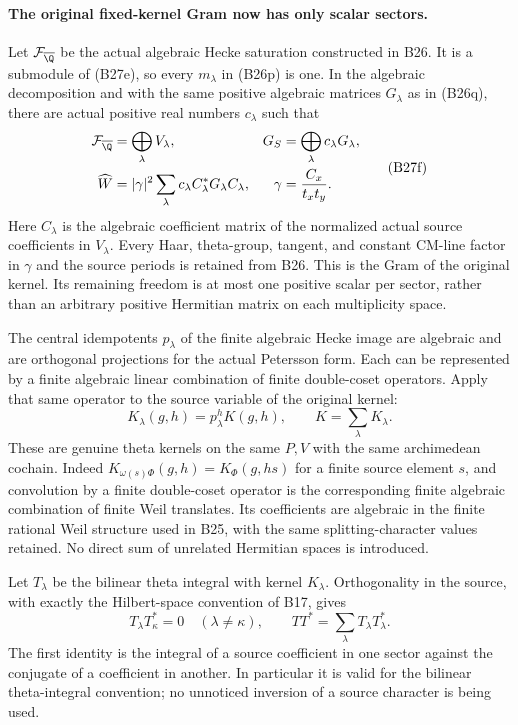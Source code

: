 \paragraph{The original fixed-kernel Gram now has only scalar sectors.}
Let $\mathcal F_{\overline\Q}$ be the actual algebraic Hecke
saturation constructed in B26.  It is a submodule of (B27e),
so every $m_\lambda$ in (B26p) is one.  In the algebraic
decomposition and with the same positive algebraic matrices
$G_\lambda$ as in (B26q), there are actual positive real
numbers $c_\lambda$ such that
\[
 \begin{aligned}
  \mathcal F_{\overline\Q}&=\bigoplus_\lambda V_\lambda,
       &G_S&=\bigoplus_\lambda c_\lambda G_\lambda,\\
  \widehat W&=|\gamma|^2
       \sum_\lambda c_\lambda C_\lambda^*G_\lambda C_\lambda,
       &\gamma&=\frac{C_x}{t_x t_y}.
 \end{aligned}
 \tag{B27f}
\]
Here $C_\lambda$ is the algebraic coefficient matrix of
the normalized actual source coefficients in $V_\lambda$.
Every Haar, theta-group, tangent, and constant CM-line
factor in $\gamma$ and the source periods is retained from
B26.  This is the Gram of the original kernel.  Its remaining
freedom is at most one positive scalar per sector, rather
than an arbitrary positive Hermitian matrix on each
multiplicity space.

The central idempotents $p_\lambda$ of the finite algebraic
Hecke image are algebraic and are orthogonal projections for
the actual Petersson form.  Each can be represented by a
finite algebraic linear combination of finite double-coset
operators.  Apply that same operator to the source variable
of the original kernel:
\[
 K_\lambda(g,h)=p_\lambda^h K(g,h),\qquad
 K=\sum_\lambda K_\lambda.
 \tag{B27g}
\]
These are genuine theta kernels on the same $P,V$ with
the same archimedean cochain.  Indeed
$K_{\omega(s)\Phi}(g,h)=K_\Phi(g,hs)$ for a finite source
element $s$, and convolution by a finite double-coset
operator is the corresponding finite algebraic combination
of finite Weil translates.  Its coefficients are algebraic
in the finite rational Weil structure used in B25, with
the same splitting-character values retained.  No direct
sum of unrelated Hermitian spaces is introduced.

Let $T_\lambda$ be the bilinear theta integral with kernel
$K_\lambda$.  Orthogonality in the source, with exactly
the Hilbert-space convention of B17, gives
\[
 T_\lambda T_\kappa^*=0\quad(\lambda\ne\kappa),
       \qquad TT^*=\sum_\lambda T_\lambda T_\lambda^*.
 \tag{B27h}
\]
The first identity is the integral of a source coefficient
in one sector against the conjugate of a coefficient in
another.  In particular it is valid for the bilinear
theta-integral convention; no unnoticed inversion of a
source character is being used.

